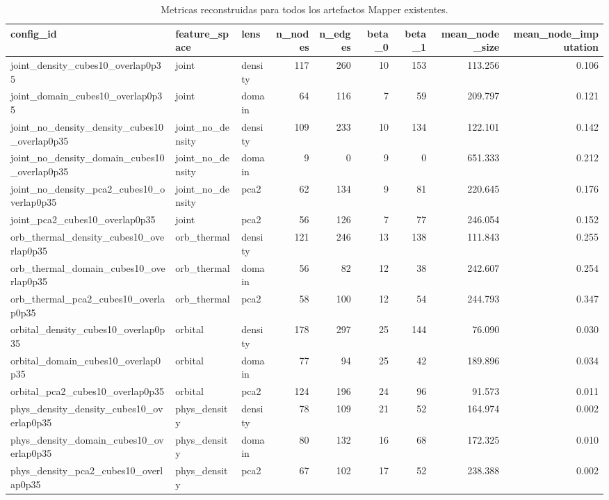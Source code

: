 \begin{table}[H]
\centering
\scriptsize
\caption{Metricas reconstruidas para todos los artefactos Mapper existentes.}
\label{tab:all_existing_mapper_metrics}
\begin{adjustbox}{max width=\linewidth}
\begin{tabular}{lllrrrrrr}
\toprule
config\_id & feature\_space & lens & n\_nodes & n\_edges & beta\_0 & beta\_1 & mean\_node\_size & mean\_node\_imputation \\
\midrule
joint\_density\_cubes10\_overlap0p35 & joint & density & 117 & 260 & 10 & 153 & 113.256 & 0.106 \\
joint\_domain\_cubes10\_overlap0p35 & joint & domain & 64 & 116 & 7 & 59 & 209.797 & 0.121 \\
joint\_no\_density\_density\_cubes10\_overlap0p35 & joint\_no\_density & density & 109 & 233 & 10 & 134 & 122.101 & 0.142 \\
joint\_no\_density\_domain\_cubes10\_overlap0p35 & joint\_no\_density & domain & 9 & 0 & 9 & 0 & 651.333 & 0.212 \\
joint\_no\_density\_pca2\_cubes10\_overlap0p35 & joint\_no\_density & pca2 & 62 & 134 & 9 & 81 & 220.645 & 0.176 \\
joint\_pca2\_cubes10\_overlap0p35 & joint & pca2 & 56 & 126 & 7 & 77 & 246.054 & 0.152 \\
orb\_thermal\_density\_cubes10\_overlap0p35 & orb\_thermal & density & 121 & 246 & 13 & 138 & 111.843 & 0.255 \\
orb\_thermal\_domain\_cubes10\_overlap0p35 & orb\_thermal & domain & 56 & 82 & 12 & 38 & 242.607 & 0.254 \\
orb\_thermal\_pca2\_cubes10\_overlap0p35 & orb\_thermal & pca2 & 58 & 100 & 12 & 54 & 244.793 & 0.347 \\
orbital\_density\_cubes10\_overlap0p35 & orbital & density & 178 & 297 & 25 & 144 & 76.090 & 0.030 \\
orbital\_domain\_cubes10\_overlap0p35 & orbital & domain & 77 & 94 & 25 & 42 & 189.896 & 0.034 \\
orbital\_pca2\_cubes10\_overlap0p35 & orbital & pca2 & 124 & 196 & 24 & 96 & 91.573 & 0.011 \\
phys\_density\_density\_cubes10\_overlap0p35 & phys\_density & density & 78 & 109 & 21 & 52 & 164.974 & 0.002 \\
phys\_density\_domain\_cubes10\_overlap0p35 & phys\_density & domain & 80 & 132 & 16 & 68 & 172.325 & 0.010 \\
phys\_density\_pca2\_cubes10\_overlap0p35 & phys\_density & pca2 & 67 & 102 & 17 & 52 & 238.388 & 0.002 \\

\end{tabular}
\end{adjustbox}
\end{table}
